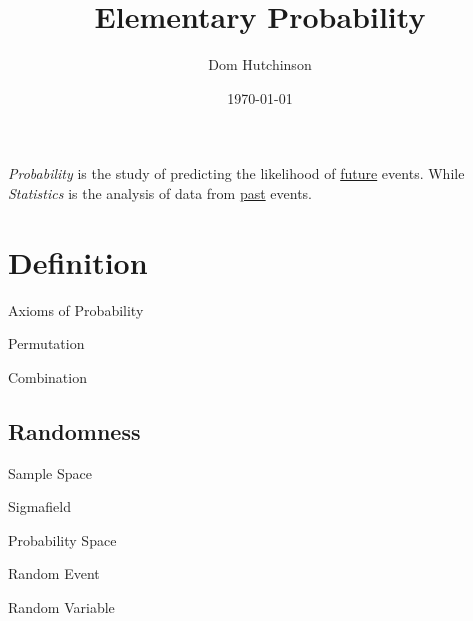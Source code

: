 \documentclass[11pt,a4paper]{article}
\begin{document}
\title{Elementary Probability}
\author{Dom Hutchinson}
\date{\today}
\maketitle

\textit{Probability} is the study of predicting the likelihood of \underline{future} events. While \textit{Statistics} is the analysis of data from \underline{past} events.

\section{Definition}

\begin{definition}{Axioms of Probability}

\end{definition}

\begin{definition}{Permutation}
\end{definition}

\begin{definition}{Combination}
\end{definition}

\subsection{Randomness}

\begin{definition}{Sample Space}

\end{definition}

\begin{definition}{Sigmafield}

\end{definition}

\begin{definition}{Probability Space}

\end{definition}

\begin{definition}{Random Event}
\end{definition}

\begin{definition}{Random Variable}

\end{definition}
\end{document}
